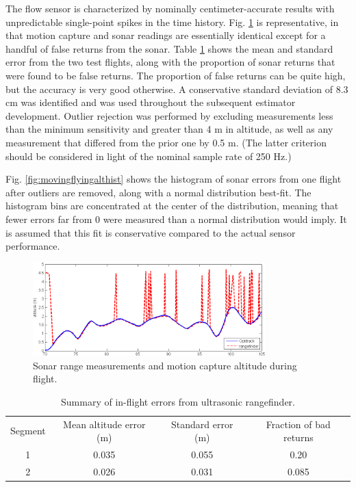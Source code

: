 \documentclass{article}
\begin{document}
The flow sensor is characterized by nominally centimeter-accurate results with unpredictable single-point spikes in the time history. Fig. \ref {fig:movingflyingalt} is representative, in that motion capture and sonar readings are essentially identical except for a handful of false returns from the sonar. Table \ref{tab:altErrs} shows the mean and standard error from the two test flights, along with the proportion of sonar returns that were found to be false returns. The proportion of false returns can be quite high, but the accuracy is very good otherwise. A conservative standard deviation of 8.3 cm was identified and was used throughout the subsequent estimator development. Outlier rejection was performed by excluding measurements less than the minimum sensitivity and greater than 4 m in altitude, as well as any measurement that differed from the prior one by 0.5 m. (The latter criterion should be considered in light of the nominal sample rate of 250 Hz.)

Fig. \ref{fig:movingflyingalthist} shows the histogram of sonar errors from one flight after outliers are removed, along with a normal distribution best-fit. The histogram bins are concentrated at the center of the distribution, meaning that fewer errors far from 0 were measured than a normal distribution would imply. It is assumed that this fit is conservative compared to the actual sensor performance.

\begin{figure}[tb!]
\centering
\includegraphics[width=0.8\textwidth]{../../sensor characterization/moving_flying_alt.png}
\caption{Sonar range measurements and motion capture altitude during flight.}
\label{fig:movingflyingalt}
\end{figure}

\begin{table}
\centering
\begin{tabular}{c|c|c|c}
Segment & Mean altitude error (m) & Standard error (m)& Fraction of bad returns\\
1 & 0.035 & 0.055 & 0.20\\
2 & 0.026 & 0.031 & 0.085\\
\end{tabular}
\caption{Summary of in-flight errors from ultrasonic rangefinder.}
\label{tab:altErrs}
\end{table}
\end{document}
